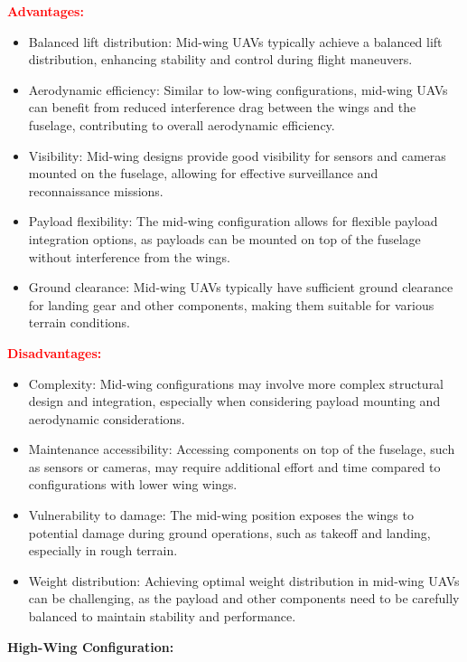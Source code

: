 \documentclass[12 pt]{article}
\begin{document}
{\color{black}
\textbf{\textcolor{red}{Advantages:}}
\begin{itemize}
  \item Balanced lift distribution: Mid-wing UAVs typically achieve a balanced lift distribution, enhancing stability and control during flight maneuvers.
  \item Aerodynamic efficiency: Similar to low-wing configurations, mid-wing UAVs can benefit from reduced interference drag between the wings and the fuselage, contributing to overall aerodynamic efficiency.
  \item Visibility: Mid-wing designs provide good visibility for sensors and cameras mounted on the fuselage, allowing for effective surveillance and reconnaissance missions.
  \item Payload flexibility: The mid-wing configuration allows for flexible payload integration options, as payloads can be mounted on top of the fuselage without interference from the wings.
  \item Ground clearance: Mid-wing UAVs typically have sufficient ground clearance for landing gear and other components, making them suitable for various terrain conditions.
\end{itemize}

\textbf{\textcolor{red}{Disadvantages:}}
\begin{itemize}
  \item Complexity: Mid-wing configurations may involve more complex structural design and integration, especially when considering payload mounting and aerodynamic considerations.
  \item Maintenance accessibility: Accessing components on top of the fuselage, such as sensors or cameras, may require additional effort and time compared to configurations with lower wing wings.
  \item Vulnerability to damage: The mid-wing position exposes the wings to potential damage during ground operations, such as takeoff and landing, especially in rough terrain.
  \item Weight distribution: Achieving optimal weight distribution in mid-wing UAVs can be challenging, as the payload and other components need to be carefully balanced to maintain stability and performance.
\end{itemize}
}

{\color{red}\textbf{High-Wing Configuration:}}
\end{document}
